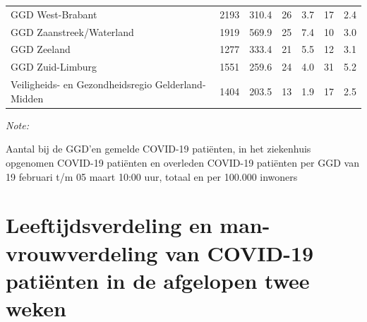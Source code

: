 \documentclass[
  english,
  man,floatsintext]{apa6}
\begin{document}
\begin{table}
\begin{threeparttable}
\begin{tabular}{lrrrrrr}
GGD West-Brabant & 2193 & 310.4 & 26 & 3.7 & 17 & 2.4\\
GGD Zaanstreek/Waterland & 1919 & 569.9 & 25 & 7.4 & 10 & 3.0\\
GGD Zeeland & 1277 & 333.4 & 21 & 5.5 & 12 & 3.1\\
GGD Zuid-Limburg & 1551 & 259.6 & 24 & 4.0 & 31 & 5.2\\
Veiligheids- en Gezondheidsregio Gelderland-Midden & 1404 & 203.5 & 13 & 1.9 & 17 & 2.5\\
\bottomrule
\end{tabular}
\begin{tablenotes}
\item \textit{Note: } 
\item Aantal bij de GGD’en gemelde COVID-19 patiënten, in het ziekenhuis opgenomen COVID-19 patiënten en overleden COVID-19 patiënten per GGD van 19 februari t/m 05 maart 10:00 uur, totaal en per 100.000 inwoners
\end{tablenotes}
\end{threeparttable}
\endgroup{}
\end{table}

\newpage

\hypertarget{leeftijdsverdeling-en-man-vrouwverdeling-van-covid-19-patiuxebnten-in-de-afgelopen-twee-weken}{%
\section{Leeftijdsverdeling en man-vrouwverdeling van COVID-19 patiënten in de afgelopen twee weken}\label{leeftijdsverdeling-en-man-vrouwverdeling-van-covid-19-patiuxebnten-in-de-afgelopen-twee-weken}}
\end{document}
